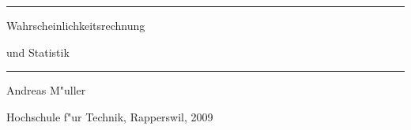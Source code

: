 \documentclass[a4paper,12pt]{book}
\begin{document}
\pagestyle{fancy}
\frontmatter
\newcommand\HRule{\noindent\rule{\linewidth}{1.5pt}}
\begin{titlepage}
\HRule
\vspace*{10pt}
\begin{flushright}
{\Huge
Wahrscheinlichkeitsrechnung}
\end{flushright}
\begin{flushright}
{\Huge und Statistik}
\end{flushright}
\HRule
\begin{flushright}
\vspace{30pt}
\LARGE
Andreas M"uller
\end{flushright}
\begin{center}
Hochschule f"ur Technik, Rapperswil, 2009
\end{center}
\end{titlepage}

\newenvironment{beispiele}{
\bgroup\smallskip\parindent0pt\bf Beispiele\egroup

\begin{list}{\arabic{beispiel}.}
  {\usecounter{beispiel}
  \setlength{\labelsep}{5mm}
  \setlength{\rightmargin}{0pt}
}}{\end{list}}
\newenvironment{teilaufgaben}{
\begin{enumerate}
\renewcommand{\labelenumi}{\alph{enumi})}
}{\end{enumerate}}
\def\swallow#1{
}
\newenvironment{loesung}{%
\begin{proof}[L"osung]%
\renewcommand{\qedsymbol}{$\bigcirc$}
}{\end{proof}}
\def\keineloesungen{%
\renewenvironment{loesung}{\swallow\begingroup}{\endgroup}%
}

\hypersetup{
    colorlinks=true,
    linktoc=all,
    linkcolor=blue
}

\tableofcontents
\newtheorem{satz}{Satz}[chapter]
\newtheorem{hilfssatz}{Hilfssatz}[chapter]
\newtheorem{definition}{Definition}[chapter]
\newtheorem{annahme}{Annahme}[chapter]
\mainmatter











\appendix
%





\end{document}
